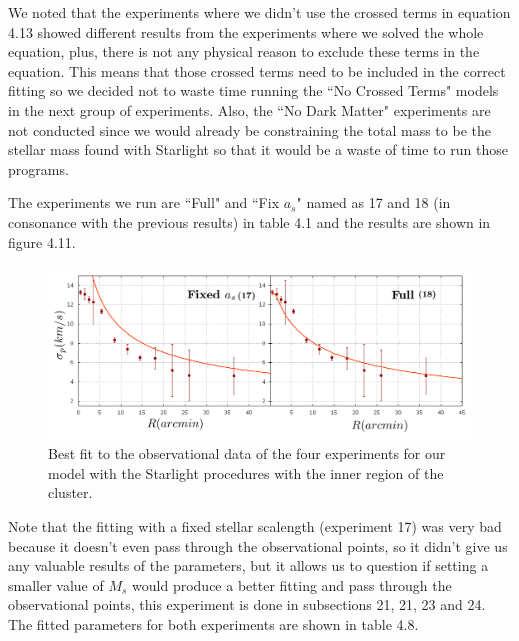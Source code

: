 We noted that the experiments where we didn't use the crossed terms in equation 4.13 showed different results from the experiments where we solved the whole equation, plus, there is not any physical reason to exclude these terms in the equation. This means that those crossed terms need to be included in the correct fitting so we decided not to waste time running the ``No Crossed Terms" models in the next group of experiments. Also, the ``No Dark Matter" experiments are not conducted since we would already be constraining the total mass to be the stellar mass found with Starlight so that it would be a waste of time to run those programs.

The experiments we run are ``Full" and ``Fix $a_s$" named as 17 and 18 (in consonance with the previous results) in table 4.1 and the results are shown in figure 4.11.

\begin{figure}[H]
\centering
\includegraphics[width=15cm]{images/Starlight_2.png}
\caption[Best fit of our model with the mass found with the Starlight procedures with the inner region]{Best fit to the observational data of the four experiments for our model with the Starlight procedures with the inner region of the cluster.}
\end{figure}

Note that the fitting with a fixed stellar scalength (experiment 17) was very bad because it doesn't even pass through the observational points, so it didn't give us any valuable results of the parameters, but it allows us to question if setting a smaller value of $M_s$ would produce a better fitting and pass through the observational points, this experiment is done in subsections 21, 21, 23 and 24. The fitted parameters for both experiments are shown in table 4.8. 

